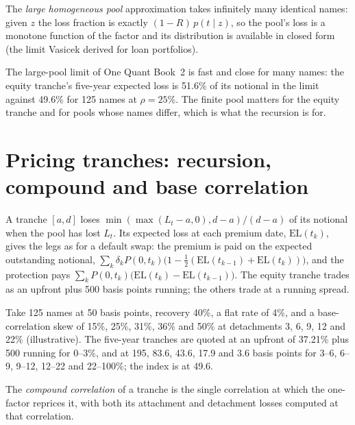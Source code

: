\begin{definition}\label{def:rc:portfolio-credit:lhp}
The \emph{large homogeneous pool} approximation takes
infinitely many identical names: given $z$ the loss fraction is exactly
$(1-R)\,p(t\mid z)$, so the pool's loss is a monotone function of the factor and its
distribution is available in closed form (the limit Vasicek derived for loan portfolios).
\end{definition}

The large-pool limit of One Quant Book~2 is fast and close for many names: the equity
tranche's five-year expected loss is 51.6\% of its notional in the limit against 49.6\% for
125 names at $\rho = 25\%$. The finite pool matters for the equity tranche and for pools
whose names differ, which is what the recursion is for.

\section{Pricing tranches: recursion, compound and base correlation}

A tranche $[a,d]$ loses $\min(\max(L_t-a,0),d-a)/(d-a)$ of its notional when the pool
has lost $L_t$. Its expected loss at each premium date, $\mathrm{EL}(t_k)$, gives the legs as for
a default swap: the premium is paid on the expected outstanding notional,
$\sum_k\delta_kP(0,t_k)\bigl(1-\tfrac12(\mathrm{EL}(t_{k-1})+\mathrm{EL}(t_k))\bigr)$, and the protection
pays $\sum_kP(0,t_k)\bigl(\mathrm{EL}(t_k)-\mathrm{EL}(t_{k-1})\bigr)$. The equity tranche trades as an upfront
plus 500 basis points running; the others trade at a running spread.

\begin{example}\label{ex:rc:portfolio-credit:quotes}
Take 125 names at 50 basis points, recovery 40\%, a flat rate of 4\%, and a base-correlation
skew of 15\%, 25\%, 31\%, 36\% and 50\% at detachments 3, 6, 9, 12 and 22\% (illustrative).
The five-year tranches are quoted at an upfront of 37.21\% plus 500 running for 0--3\%, and
at 195, 83.6, 43.6, 17.9 and 3.6 basis points for 3--6, 6--9, 9--12, 12--22 and 22--100\%;
the index is at 49.6.
\end{example}

\begin{definition}\label{def:rc:portfolio-credit:compound}
The \emph{compound correlation} of a tranche is the single
correlation at which the one-factor  reprices it, with both its attachment
and detachment losses computed at that correlation.
\end{definition}

